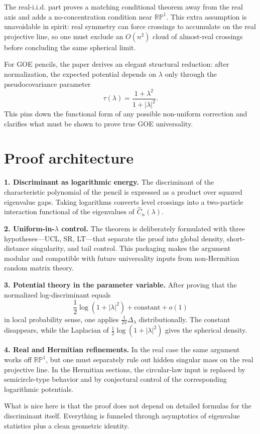 \documentclass[11pt]{article}
\begin{document}
The real-i.i.d. part proves a matching conditional theorem away from the real axis and adds a no-concentration condition near $\mathbb{RP}^1$. This extra assumption is unavoidable in spirit: real symmetry can force crossings to accumulate on the real projective line, so one must exclude an $O(n^2)$ cloud of almost-real crossings before concluding the same spherical limit.

For GOE pencils, the paper derives an elegant structural reduction: after normalization, the expected potential depends on $\lambda$ only through the pseudocovariance parameter
\[
\tau(\lambda)=\frac{1+\lambda^2}{1+|\lambda|^2}.
\]
This pins down the functional form of any possible non-uniform correction and clarifies what must be shown to prove true GOE universality.

\section*{Proof architecture}
\textbf{1. Discriminant as logarithmic energy.} The discriminant of the characteristic polynomial of the pencil is expressed as a product over squared eigenvalue gaps. Taking logarithms converts level crossings into a two-particle interaction functional of the eigenvalues of $\widehat C_n(\lambda)$.

\textbf{2. Uniform-in-$\lambda$ control.} The theorem is deliberately formulated with three hypotheses---UCL, SR, LT---that separate the proof into global density, short-distance singularity, and tail control. This packaging makes the argument modular and compatible with future universality inputs from non-Hermitian random matrix theory.

\textbf{3. Potential theory in the parameter variable.} After proving that the normalized log-discriminant equals
\[
\frac12\log(1+|\lambda|^2)+\text{constant}+o(1)
\]
in local probability sense, one applies $\frac{1}{2\pi}\Delta_\lambda$ distributionally. The constant disappears, while the Laplacian of $\frac12\log(1+|\lambda|^2)$ gives the spherical density.

\textbf{4. Real and Hermitian refinements.} In the real case the same argument works off $\mathbb{RP}^1$, but one must separately rule out hidden singular mass on the real projective line. In the Hermitian sections, the circular-law input is replaced by semicircle-type behavior and by conjectural control of the corresponding logarithmic potentials.

What is nice here is that the proof does not depend on detailed formulas for the discriminant itself. Everything is funneled through asymptotics of eigenvalue statistics plus a clean geometric identity.
\end{document}
